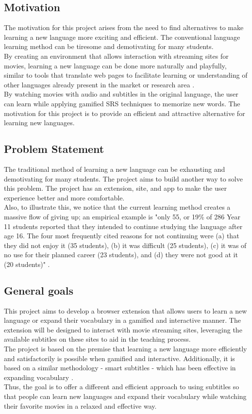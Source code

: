 \documentclass[12pt]{article}
\begin{document}
\subsection{Motivation}
The motivation for this project arises from the need to find alternatives to make learning a new language more exciting and efficient. The conventional language learning method can be tiresome and demotivating for many students. \\
By creating an environment that allows interaction with streaming sites for movies, learning a new language can be done more naturally and playfully, similar to tools that translate web pages to facilitate learning or understanding of other languages already present in the market or research area \cite{ElBatanony21}. \\
By watching movies with audio and subtitles in the original language, the user can learn while applying gamified SRS techniques to memorize new words. The motivation for this project is to provide an efficient and attractive alternative for learning new languages.

\subsection{Problem Statement}
The traditional method of learning a new language can be exhausting and demotivating for many students. The project aims to build another way to solve this problem. The project has an extension, site, and app to make the user experience better and more comfortable. \\
Also, to illustrate this, we notice that the current learning method creates a massive flow of giving up; an empirical example is "only 55, or 19\% of 286 Year 11 students reported that they intended to continue studying the language after age 16. The four most frequently cited reasons for not continuing were (a) that they did not enjoy it (35 students), (b) it was difficult (25 students), (c) it was of no use for their planned career (23 students), and (d) they were not good at it (20 students)" \cite{Graham1}. 

\subsection{General goals}

This project aims to develop a browser extension that allows users to learn a new language or expand their vocabulary in a gamified and interactive manner. The extension will be designed to interact with movie streaming sites, leveraging the available subtitles on these sites to aid in the teaching process. \\
The project is based on the premise that learning a new language more efficiently and satisfactorily is possible when gamified and interactive. Additionally, it is based on a similar methodology - smart subtitles - which has been effective in expanding vocabulary \cite{Kovacs14}. \\
Thus, the goal is to offer a different and efficient approach to using subtitles so that people can learn new languages and expand their vocabulary while watching their favorite movies in a relaxed and effective way.
\end{document}
